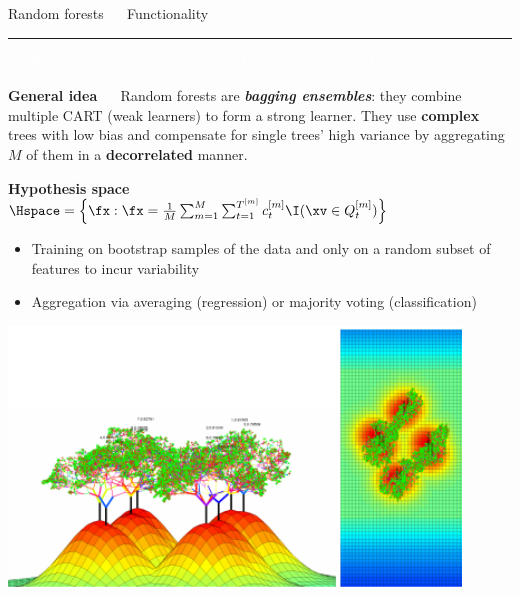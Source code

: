 \documentclass[11pt,compress,t,notes=noshow, xcolor=table]{beamer}
\begin{document}
\LARGE
\begin{frame}{\textcolor{gray!80}{Random forests} ~~ Functionality}
\normalsize
\vspace{-0.5cm}
\noindent \textcolor{gray!80}{\rule{\textwidth}{1pt}}

\vspace{0.3cm}

\footnotesize

\colorbox{gray!80}{\textcolor{white}{SUPERVISED}} 
\colorbox{gray!80}{\textcolor{white}{NON-PARAMETRIC}} 
\colorbox{gray!80}{\textcolor{white}{BLACK-BOX}} 
\colorbox{gray!80}{\textcolor{white}{FEATURE SELECTION}}

\medskip

\textbf{\textcolor{gray!80}{General idea}} ~~ Random forests are 
\textit{\textbf{bagging ensembles}}: they combine multiple CART (weak learners)
to form a strong learner. They use \textbf{complex} trees with low  bias and 
compensate for single trees' high variance by aggregating $M$ of them in a 
\textbf{decorrelated} manner. 

\medskip

\textbf{\textcolor{gray!80}{Hypothesis space}} ~~
$\Hspace = \left\{ \fx: \fx = \frac{1}{M} \sum_{m = 1}^M \sum_{t = 1}^{T^{[m]}} 
c_t^{[m]} \I(\xv \in Q_t^{[m]}) \right\}$

\medskip

\begin{minipage}{0.5\textwidth}
  \begin{itemize}
    \item Training on bootstrap samples of the data and only on a random subset 
    of features to incur variability
    \item Aggregation via averaging (regression) or majority voting
    (classification)
  \end{itemize}
\end{minipage}%
\begin{minipage}{0.5\textwidth}
  \includegraphics[width=0.9\textwidth]{figure/rf_3d.PNG}
\end{minipage}

\end{frame}
\end{document}
